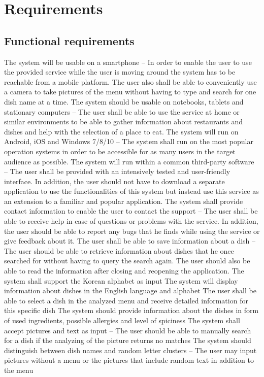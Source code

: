 \section{Requirements}
\subsection{Functional requirements}The system will be usable on a smartphone – In order to enable the user to use the provided service while the user is moving around the system has to be reachable from a mobile platform. The user also shall be able to conveniently use a camera to take pictures of the menu without having to type and search for one dish name at a time.
The system should be usable on notebooks, tablets and stationary computers – The user shall be able to use the service at home or similar environments to be able to gather information about restaurants and dishes and help with the selection of a place to eat.
The system will run on Android, iOS and Windows 7/8/10 – The system shall run on the most popular operation systems in order to be accessible for as many users in the target audience as possible.
The system will run within a common third-party software – The user shall be provided with an intensively tested and user-friendly interface. In addition, the user should not have to download a separate application to use the functionalities of this system but instead use this service as an extension to a familiar and popular application.
The system shall provide contact information to enable the user to contact the support – The user shall be able to receive help in case of questions or problems with the service. In addition, the user should be able to report any bugs that he finds while using the service or give feedback about it.
The user shall be able to save information about a dish – The user should be able to retrieve information about dishes that he once searched for without having to query the search again. The user should also be able to read the information after closing and reopening the application.
The system shall support the Korean alphabet as input
The system will display information about dishes in the English language and alphabet
The user shall be able to select a dish in the analyzed menu and receive detailed information for this specific dish
The system should provide information about the dishes in form of used ingredients, possible allergies and level of spiciness
The system shall accept pictures and text as input – The user should be able to manually search for a dish if the analyzing of the picture returns no matches
The system should distinguish between dish names and random letter clusters – The user may input pictures without a menu or the pictures that include random text in addition to the menu


